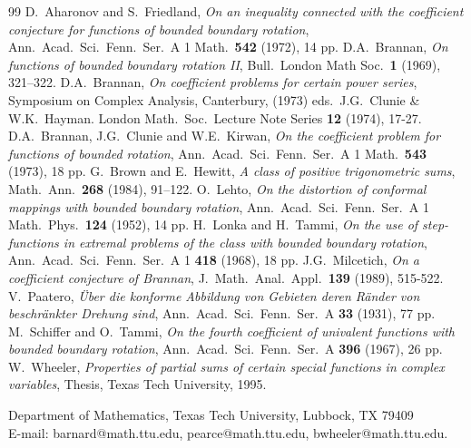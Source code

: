 \begin{thebibliography}{99}
 D.\ Aharonov and S.\ Friedland, {\em On an
inequality connected with the coefficient conjecture for functions of
bounded boundary rotation}, Ann.\ Acad.\ Sci.\ Fenn.\ Ser.\ A 1
Math.\ {\bf 542} (1972), 14 pp.
 D.A.\ Brannan, {\em On functions of bounded boundary
rotation II}, Bull.\ London Math Soc.\ {\bf 1} (1969), 321--322.
 D.A.\ Brannan, {\em On coefficient problems for certain
power series}, Symposium on Complex Analysis, Canterbury, (1973)
eds.\ J.G.\ Clunie \& W.K.\ Hayman.  London Math.\ Soc.\ Lecture Note
Series {\bf 12} (1974), 17-27.
 D.A.\ Brannan, J.G.\ Clunie and W.E.\ Kirwan,
{\em On the coefficient problem for functions of bounded rotation},
Ann.\ Acad.\ Sci.\ Fenn.\ Ser.\ A 1 Math.\ {\bf 543} (1973), 18 pp.
 G.\ Brown and E.\ Hewitt, {\em A class of positive
trigonometric sums}, Math.\ Ann.\ {\bf 268} (1984), 91--122.
 O.\ Lehto, {\em On the distortion of conformal
mappings with bounded boundary rotation}, Ann.\ Acad.\ Sci.\ Fenn.\
Ser.\ A 1 Math.\ Phys.\ {\bf 124} (1952), 14 pp.
 H.\ Lonka and H.\ Tammi, {\em On the use of
step-functions in extremal problems of the class with bounded
boundary rotation}, Ann.\ Acad.\ Sci.\ Fenn.\ Ser.\ A 1 {\bf 418}
(1968), 18 pp.
 J.G.\ Milcetich, {\em On a coefficient conjecture of
Brannan}, J.\ Math.\ Anal.\ Appl.\ {\bf 139} (1989), 515-522.
 V.\ Paatero, {\em \"{U}ber die konforme Abbildung 
von Gebieten deren R\"{a}nder von beschr\"{a}nkter Drehung sind},
Ann.\ Acad.\ Sci.\ Fenn.\ Ser.\ A {\bf 33} (1931), 77 pp.
 M.\ Schiffer and O.\ Tammi, {\em On the fourth
coefficient of univalent functions with bounded boundary rotation},
Ann.\ Acad.\ Sci.\ Fenn.\ Ser.\ A {\bf 396} (1967), 26 pp.
 W.\ Wheeler, {\em Properties of partial sums of
certain special functions in complex variables}, Thesis, Texas Tech
University, 1995.
\end{thebibliography}

\noindent Department of Mathematics, Texas Tech University, Lubbock,
TX 79409\\
\noindent E-mail: barnard@math.ttu.edu, pearce@math.ttu.edu, 
bwheeler@math.ttu.edu.

